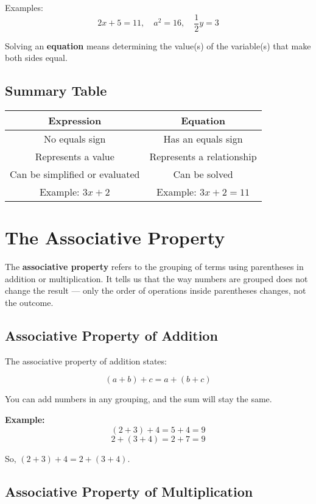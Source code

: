 \documentclass[11pt]{article}
\begin{document}
Examples:
\[
2x + 5 = 11, \quad a^2 = 16, \quad \frac{1}{2}y = 3
\]

Solving an \textbf{equation} means determining the value(s) of the variable(s) that make both sides equal.

\subsection*{Summary Table}

\begin{center}
\begin{tabular}{|c|c|}
\hline
\textbf{Expression} & \textbf{Equation} \\
\hline
No equals sign & Has an equals sign \\
Represents a value & Represents a relationship \\
Can be simplified or evaluated & Can be solved \\
Example: \( 3x + 2 \) & Example: \( 3x + 2 = 11 \) \\
\hline
\end{tabular}
\end{center}

\section{The Associative Property}

The \textbf{associative property} refers to the grouping of terms using parentheses in addition or multiplication. It tells us that the way numbers are grouped does not change the result — only the order of operations inside parentheses changes, not the outcome.

\subsection{Associative Property of Addition}

The associative property of addition states:

\[
(a + b) + c = a + (b + c)
\]

You can add numbers in any grouping, and the sum will stay the same.

\textbf{Example:}
\[
(2 + 3) + 4 = 5 + 4 = 9
\]
\[
2 + (3 + 4) = 2 + 7 = 9
\]

So, \( (2 + 3) + 4 = 2 + (3 + 4) \).

\subsection{Associative Property of Multiplication}
\end{document}
